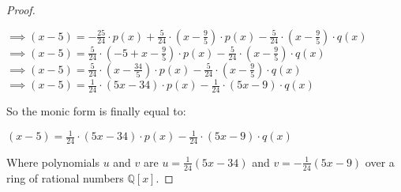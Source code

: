 \documentclass{article}
\begin{document}
\begin{proof}
\begin{center}
$\implies (x-5) = -\frac{25}{24} \cdot p(x) + \frac{5}{24} \cdot (x - \frac{9}{5}) \cdot p(x) - \frac{5}{24} \cdot (x - \frac{9}{5}) \cdot q(x)$ \\
$\implies (x-5) = \frac{5}{24} \cdot (-5 + x - \frac{9}{5}) \cdot p(x) - \frac{5}{24} \cdot (x - \frac{9}{5}) \cdot q(x)$\\
$\implies (x-5) = \frac{5}{24} \cdot (x - \frac{34}{5}) \cdot p(x) - \frac{5}{24} \cdot (x - \frac{9}{5}) \cdot q(x)$\\
$\implies (x-5) = \frac{1}{24} \cdot (5x - 34) \cdot p(x) - \frac{1}{24} \cdot (5x - 9) \cdot q(x)$
\end{center}
So the monic form is finally equal to:
\begin{center}
$ (x-5) = \frac{1}{24} \cdot (5x - 34) \cdot p(x) - \frac{1}{24} \cdot (5x - 9) \cdot q(x)$
\end{center}
Where polynomials $u$ and $v$ are $u=\frac{1}{24}(5x - 34)$ and $v=-\frac{1}{24}(5x - 9)$ over a ring of rational numbers $\mathbb{Q}[x]$.
\end{proof}
\end{document}
